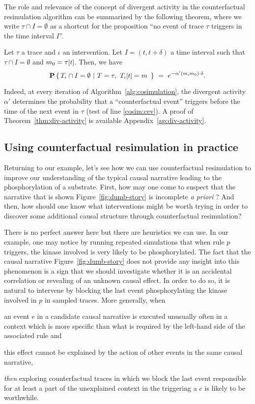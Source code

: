 The role and relevance of the concept of divergent activity in the
counterfactual resimulation algorithm can be summarized by the
following theorem, where we write $\tau \cap I = \emptyset$ as a
shortcut for the proposition ``no event of trace $\tau$ triggers in
the time interval $I$''.
\begin{theorem}\label{thm:div-activity}
  Let $\tau$ a trace
  and $\iota$ an intervention. Let $I = (t, t+\delta)$ a time interval
  such that $\tau \cap I = \emptyset$ and $m_0 =
  \TSTATE{t}{\tau}$. Then, we have
  \[\CProb{ \ATRAJ{} \cap I = \emptyset }{ T=\tau,\
      \TSTATE{t}{\ATRAJ{}} = m\ }
    \ =\ e^{-\alpha'(m, m_0) \cdot \delta}.
  \]
\end{theorem}
\noindent Indeed, at every iteration of
Algorithm~\ref{alg:cosimulation}, the divergent activity $\alpha'$
determines the probability that a ``counterfactual event'' triggers
before the time of the next event in $\tau$ (test of line
\ref{cosim:cev}).  A proof of Theorem~\ref{thm:div-activity} is
available Appendix~\ref{ap:div-activity}.




\subsection{Using counterfactual resimulation in practice}
\label{subsec:cosim-practice}

Returning to our example, let's see how we can use counterfactual
resimulation to improve our understanding of the typical causal
narrative leading to the phosphorylation of a substrate. First, how
may one come to suspect that the narrative that is shown
Figure~\ref{fig:dumb-story} is incomplete \textit{a priori} ? And
then, how should one know what interventions might be worth trying in
order to discover some additional causal structure through
counterfactual resimulation?

There is no perfect answer here but there are heuristics we can
use. In our example, one may notice by running repeated simulations
that when rule $p$ triggers, the kinase involved is very likely to be
phosphorylated. The fact that the causal narrative
Figure~\ref{fig:dumb-story} does not provide any insight into this
phenomenon is a sign that we should investigate whether it is
an accidental correlation or revealing of an unknown causal effect. In
order to do so, it is natural to intervene by blocking the last event
phosphorylating the kinase involved in $p$ in sampled traces. More
generally, when
\begin{inparaenum}[(i)]
\item an event $e$ in a candidate causal narrative is executed
  unusually often in a context which is more specific than what is
  required by the left-hand side of the associated rule and
\item this effect cannot be explained by the action of other events in
  the same causal narrative,
\end{inparaenum}
\textit{then} exploring counterfactual traces in which we block the last event
responsible for at least a part of the unexplained context in the
triggering a $e$ is likely to be worthwhile.

